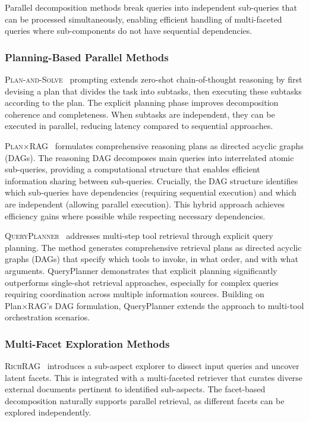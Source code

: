 \documentclass{article}
\begin{document}
Parallel decomposition methods break queries into independent sub-queries that can be processed simultaneously, enabling efficient handling of multi-faceted queries where sub-components do not have sequential dependencies.

\subsubsection{Planning-Based Parallel Methods}

\textsc{Plan-and-Solve}~\citep{Plan-and-Solve} prompting extends zero-shot chain-of-thought reasoning by first devising a plan that divides the task into subtasks, then executing these subtasks according to the plan. The explicit planning phase improves decomposition coherence and completeness. When subtasks are independent, they can be executed in parallel, reducing latency compared to sequential approaches.

\textsc{Plan×RAG}~\citep{plantimesrag} formulates comprehensive reasoning plans as directed acyclic graphs (DAGs). The reasoning DAG decomposes main queries into interrelated atomic sub-queries, providing a computational structure that enables efficient information sharing between sub-queries. Crucially, the DAG structure identifies which sub-queries have dependencies (requiring sequential execution) and which are independent (allowing parallel execution). This hybrid approach achieves efficiency gains where possible while respecting necessary dependencies.

\textsc{QueryPlanner}~\citep{QueryPlanner} addresses multi-step tool retrieval through explicit query planning. The method generates comprehensive retrieval plans as directed acyclic graphs (DAGs) that specify which tools to invoke, in what order, and with what arguments. QueryPlanner demonstrates that explicit planning significantly outperforms single-shot retrieval approaches, especially for complex queries requiring coordination across multiple information sources. Building on Plan×RAG's DAG formulation, QueryPlanner extends the approach to multi-tool orchestration scenarios.

\subsubsection{Multi-Facet Exploration Methods}

\textsc{RichRAG}~\citep{RichRAG} introduces a sub-aspect explorer to dissect input queries and uncover latent facets. This is integrated with a multi-faceted retriever that curates diverse external documents pertinent to identified sub-aspects. The facet-based decomposition naturally supports parallel retrieval, as different facets can be explored independently.
\end{document}
